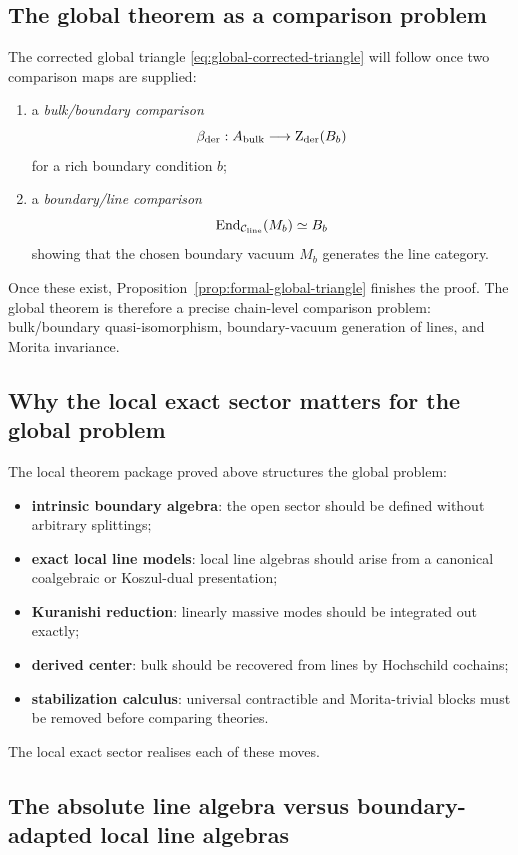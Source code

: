 \subsection{The global theorem as a comparison problem}

The corrected global triangle \eqref{eq:global-corrected-triangle} will follow once two comparison maps are supplied:

\begin{enumerate}[label=(\arabic*),leftmargin=1.8em]
\item a \emph{bulk/boundary comparison}
\[
\beta_{\mathrm{der}}:A_{\mathrm{bulk}}\longrightarrow \operatorname{Z}_{\mathrm{der}}(B_b)
\]
for a rich boundary condition $b$;
\item a \emph{boundary/line comparison}
\[
\operatorname{End}_{\mathcal C_{\mathrm{line}}}(M_b)\simeq B_b
\]
showing that the chosen boundary vacuum $M_b$ generates the line category.
\end{enumerate}

Once these exist, Proposition~\ref{prop:formal-global-triangle}
finishes the proof. The global theorem is therefore a precise
chain-level comparison problem: bulk/boundary quasi-isomorphism,
boundary-vacuum generation of lines, and Morita invariance.

\subsection{Why the local exact sector matters for the global problem}

The local theorem package proved above structures the global problem:
\begin{itemize}[leftmargin=1.8em]
\item \textbf{intrinsic boundary algebra}: the open sector should be defined without arbitrary splittings;
\item \textbf{exact local line models}: local line algebras should arise from a canonical coalgebraic or Koszul-dual presentation;
\item \textbf{Kuranishi reduction}: linearly massive modes should be integrated out exactly;
\item \textbf{derived center}: bulk should be recovered from lines by Hochschild cochains;
\item \textbf{stabilization calculus}: universal contractible and Morita-trivial blocks must be removed before comparing theories.
\end{itemize}
The local exact sector realises each of these moves.

\subsection{The absolute line algebra versus boundary-adapted local line algebras}

